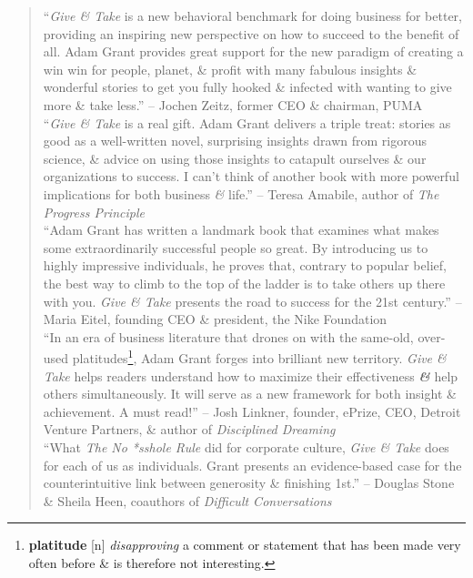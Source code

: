 \documentclass[oneside]{book}
\numberwithin{equation}{section}
\begin{document}
\begin{quotation}
	``\textit{Give \& Take} is a new behavioral benchmark for doing business for better, providing an inspiring new perspective on how to succeed to the benefit of all. Adam Grant provides great support for the new paradigm of creating a win win for people, planet, \& profit with many fabulous insights \& wonderful stories to get you fully hooked \& infected with wanting to give more \& take less.'' -- Jochen Zeitz, former CEO \& chairman, PUMA\\
	
	``\textit{Give \& Take} is a real gift. Adam Grant delivers a triple treat: stories as good as a well-written novel, surprising insights drawn from rigorous science, \& advice on using those insights to catapult ourselves \& our organizations to success. I can't think of another book with more powerful implications for both business \textit{\&} life.'' -- Teresa Amabile, author of \textit{The Progress Principle}\\
	
	``Adam Grant has written a landmark book that examines what makes some extraordinarily successful people so great. By introducing us to highly impressive individuals, he proves that, contrary to popular belief, the best way to climb to the top of the ladder is to take others up there with you. \textit{Give \& Take} presents the road to success for the 21st century.'' -- Maria Eitel, founding CEO \& president, the Nike Foundation\\
	
	``In an era of business literature that drones on with the same-old, over-used platitudes\footnote{\textbf{platitude} [n] \textit{disapproving} a comment or statement that has been made very often before \& is therefore not interesting.}, Adam Grant forges into brilliant new territory. \textit{Give \& Take} helps readers understand how to maximize their effectiveness \textbf{\textit{\&}} help others simultaneously. It will serve as a new framework for both insight \& achievement. A must read!'' -- Josh Linkner, founder, ePrize, CEO, Detroit Venture Partners, \& author of \textit{Disciplined Dreaming}\\
	
	``What \textit{The No *sshole Rule} did for corporate culture, \textit{Give \& Take} does for each of us as individuals. Grant presents an evidence-based case for the counterintuitive link between generosity \& finishing 1st.'' -- Douglas Stone \& Sheila Heen, coauthors of \textit{Difficult Conversations}\\
	

\end{quotation}
\end{document}
